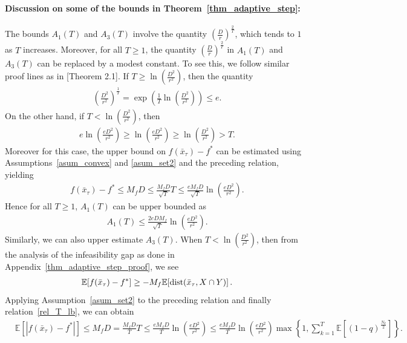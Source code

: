 \documentclass{article}
\def\dist{{\rm dist}}
\newcommand{\EXP}[1]
{\mathbb{E}\!\left[#1\right] }
\theoremstyle{plain}
\theoremstyle{definition}
\theoremstyle{remark}
\begin{document}
\paragraph{Discussion on some of the bounds in Theorem~\ref{thm_adaptive_step}:}
The bounds $A_1(T)$ and $A_3(T)$ involve the quantity $\left(\frac{D}{r}\right)^{\frac{2}{T}}$, which tends to $1$ as $T$ increases. Moreover, for all $T \geq 1$, the quantity $\left(\frac{D}{r}\right)^{\frac{2}{T}}$ in $A_1(T)$ and $A_3(T)$ can be replaced by a modest constant. To see this, we follow similar proof lines as in \cite{moshtaghifar2025dada} [Theorem 2.1]. If $T \geq \ln \left( \frac{D^2}{r^2} \right)$, then the quantity
\begin{align}
    \left( \frac{D^2}{r^2} \right)^{\frac{1}{T}} = \exp \left( \frac{1}{T} \ln \left( \frac{D^2}{r^2} \right) \right) \leq e . \label{rel_T_gtr}
\end{align}
On the other hand, if $T < \ln\left( \frac{D^2}{r^2} \right)$, then 
\begin{align}
    e \ln \left( \frac{e D^2}{r^2} \right) \geq \ln \left( \frac{e D^2}{r^2} \right) \geq \ln \left( \frac{D^2}{r^2} \right) > T . \label{rel_T_lb}
\end{align}
Moreover for this case, the upper bound on $f(\bar x_\tau) - f^*$ can be estimated using Assumptions~\ref{asum_convex} and \ref{asum_set2} and the preceding relation, yielding
\begin{align*}
    f(\bar x_\tau) - f^* \leq M_f D \leq \frac{M_f D}{\sqrt{T}} T \leq \frac{e M_f D}{\sqrt{T}} \ln \left( \frac{e D^2}{r^2} \right).
\end{align*}
Hence for all $T \geq 1$, $A_1(T)$ can be upper bounded as
\begin{align*}
    A_1(T) \leq \frac{2 e D M_f} {\sqrt{T}} \ln \left( \frac{e D^2}{r^2} \right) .
\end{align*}
Similarly, we can also upper estimate $A_3(T)$. When $T < \ln\left( \frac{D^2}{r^2} \right)$, then from the analysis of the infeasibility gap as done in Appendix~\ref{thm_adaptive_step_proof}, we see
\begin{align*}
    \EXP{f(\bar x_\tau) - f^*} \geq -M_f \EXP{\dist(\bar x_{\tau}, X \cap Y)} .
\end{align*}
Applying Assumption~\ref{asum_set2} to the preceding relation and finally relation~\eqref{rel_T_lb}, we can obtain
\begin{align*}
    &\EXP{|f(\bar x_\tau) - f^*|} \leq M_f D = \frac{M_f D}{T} T \leq  \frac{e M_f D}{T} \ln \left( \frac{e D^2}{r^2} \right) \leq \frac{e M_f D}{T} \ln \left( \frac{e D^2}{r^2} \right) \max \left\{1, \sum_{k=1}^T \EXP{(1-q)^{\frac{N_{k}}{2}}} \right\} .
\end{align*}
\end{document}
